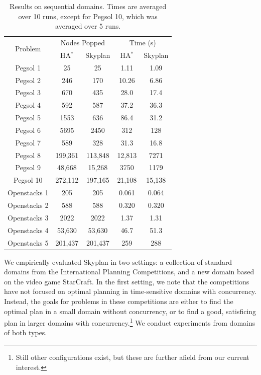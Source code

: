 \documentclass[letterpaper]{article}
\theoremstyle{plain} \newtheorem{theorem}{Theorem} \newtheorem{proposition}{Proposition} \newtheorem{lemma}{Lemma}
\theoremstyle{definition} \newtheorem{definition}{Definition} \newtheorem{conjecture}{Conjecture} \newtheorem*{example}{Example}
\theoremstyle{remark} \newtheorem*{remark}{Remark} \newtheorem*{note}{Note} \newtheorem{case}{Case}
\newcommand{\HAstar}{HA$^*$ }
\begin{document}
\begin{table}
  \footnotesize
	\begin{center}
		\begin{tabular}{|c|cc|cc|}
			\hline
			\multirow{2}{*}{Problem} & \multicolumn{2}{c|}{Nodes Popped} & \multicolumn{2}{c|}{Time (s) } \\
			& \HAstar & Skyplan & \HAstar & Skyplan \\
			\hline
			Pegsol 1 & 25 & 25 & 1.11 & 1.09 \\
			Pegsol 2 & 246 & 170 & 10.26 & 6.86 \\
			Pegsol 3 & 670 & 435 & 28.0 & 17.4 \\
			Pegsol 4 & 592 & 587 & 37.2 & 36.3 \\
			Pegsol 5 & 1553 & 636 & 86.4 & 31.2 \\
			Pegsol 6 & 5695 & 2450 & 312 & 128 \\
			Pegsol 7 & 589 & 328 & 31.3 & 16.8 \\
			Pegsol 8 & 199,361 & 113,848 & 12,813 & 7271 \\
			Pegsol 9 & 48,668 & 15,268 & 3750 & 1179 \\
			Pegsol 10 & 272,112 & 197,165 & 21,108 & 15,138 \\
			\hline
			Openstacks 1 & 205 & 205 & 0.061 & 0.064 \\
			Openstacks 2 & 588 & 588 & 0.320 & 0.320 \\
			Openstacks 3 & 2022 & 2022 & 1.37 & 1.31 \\
			Openstacks 4 & 53,630 & 53,630 & 46.7 & 51.3 \\
			Openstacks 5 & 201,437 & 201,437 & 259 & 288 \\
			\hline
		\end{tabular}
	\end{center}
  \vspace{-.15in}
	\caption{Results on sequential domains. Times are averaged over 10 runs, except for Pegsol 10, which was averaged over 5 runs.}
	\label{tab:seq-opt}
  \vspace{-.24in}
\end{table}






We empirically evaluated Skyplan in two settings: a collection of
standard domains from the International Planning Competitions, and
a new domain based on the video game StarCraft. In the first setting,
we note that the competitions have not focused on optimal planning
in time-sensitive domains with concurrency. Instead, the goals for
problems in  these competitions are either to find the optimal plan
in a small domain without concurrency, or to find a good, satisficing
plan in larger domains with concurrency.\footnote{Still other
configurations exist, but these are further afield from our current
interest.} We conduct experiments from domains of both types.
\end{document}
